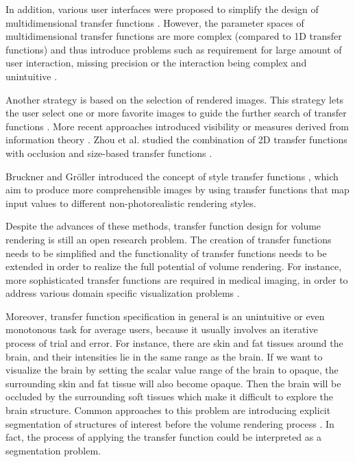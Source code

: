 \documentclass{egpubl}
\begin{document}
In addition, various user interfaces were proposed to simplify the design of multidimensional transfer functions \cite{tzeng_novel_2003} \cite{tzeng_cluster-space_2004}.
However, the parameter spaces of multidimensional transfer functions are more complex (compared to 1D transfer functions) and thus introduce problems such as requirement for large amount of user interaction, missing precision or the interaction being complex and unintuitive \cite{arens_survey_2010}.

Another strategy is based on the selection of rendered images. This strategy lets the user select one or more favorite images to guide the further search of transfer functions \cite{marks_design_1997} \cite{wu_interactive_2007}. More recent approaches introduced visibility \cite{correa_visibility-driven_2009} \cite{correa_visibility_2011} or measures derived from information theory \cite{haidacher_information-based_2008} \cite{bruckner_isosurface_2010} \cite{ruiz_automatic_2011} \cite{bramon_information_2013}. Zhou et al. studied the combination of 2D transfer functions with occlusion and size-based transfer functions \cite{zhou_transfer_2012}.

Bruckner and Gr{\"o}ller introduced the concept of style transfer functions \cite{bruckner_style_2007}, which aim to produce more comprehensible images by using transfer functions that map input values to different non-photorealistic rendering styles.

Despite the advances of these methods, transfer function design for volume rendering is still an open research problem.
The creation of transfer functions needs to be simplified and the functionality of transfer functions needs to be extended in order to realize the full potential of volume rendering. For instance, more sophisticated transfer functions are required in medical imaging, in order to address various domain specific visualization problems \cite{lindholm_spatial_2010}.

Moreover, transfer function specification in general is an unintuitive or even monotonous task for average users, because it usually involves an iterative process of trial and error.
For instance, there are skin and fat tissues around the brain, and their intensities lie in the same range as the brain. If we want to visualize the brain by setting the scalar value range of the brain to opaque, the surrounding skin and fat tissue will also become opaque. Then the brain will be occluded by the surrounding soft tissues which make it difficult to explore the brain structure.
Common approaches to this problem are introducing explicit segmentation of structures of interest before the volume rendering process \cite{rezk-salama_opacity_2006}. In fact, the process of applying the transfer function could be interpreted as a segmentation problem.
\end{document}
